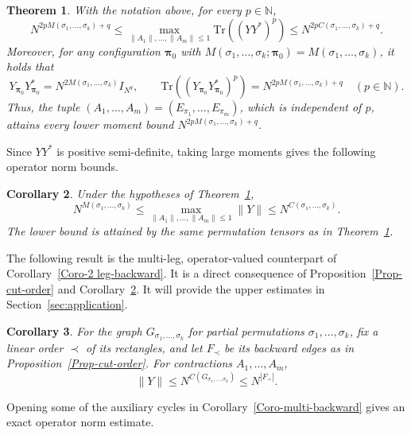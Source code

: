 \documentclass[12pt]{article}
\numberwithin{equation}{section}
\theoremstyle{plain}
\newtheorem{theorem}{Theorem}[section]
\newtheorem{corollary}[theorem]{Corollary}
\def\bN{\mathbb N}
\def\Tr{\mathrm {Tr}}
\begin{document}
\begin{theorem}\label{Thm-main-matrix}
With the notation above, for every $p\in\bN$,
\begin{equation}
N^{2pM(\sigma_1,\ldots,\sigma_k)+q}\le
\max_{\|A_1\|,\ldots,\|A_m\|\le1}\Tr((YY^*)^p)
\le N^{2pC(\sigma_1,\ldots,\sigma_k)+q}.
\end{equation}
Moreover, for any configuration $\boldsymbol\pi_0$ with $M(\sigma_1,\ldots,\sigma_k;\boldsymbol\pi_0)=M(\sigma_1,\ldots,\sigma_k)$, it holds that
\[
Y_{\boldsymbol\pi_0}Y_{\boldsymbol\pi_0}^*=N^{2M(\sigma_1,\ldots,\sigma_k)}I_{N^q},\qquad
\Tr((Y_{\boldsymbol\pi_0}Y_{\boldsymbol\pi_0}^*)^p)=N^{2pM(\sigma_1,\ldots,\sigma_k)+q}
\quad(p\in\bN).
\]
Thus, the tuple $(A_1,\ldots,A_m) = (E_{\pi_1},\ldots,E_{\pi_m})$, which is independent of $p$, attains every lower moment bound $N^{2pM(\sigma_1,\ldots,\sigma_k)+q}$.
\end{theorem}

Since $YY^*$ is positive semi-definite, taking large moments gives the following operator norm bounds.

\begin{corollary}\label{Coro-operator norm}
Under the hypotheses of Theorem~\ref{Thm-main-matrix},
\[
N^{M(\sigma_1,\ldots,\sigma_k)} \le \max_{\|A_1\|,\ldots,\|A_m\|\le1} \|Y\|\le N^{C(\sigma_1,\ldots,\sigma_k)}.
\]
The lower bound is attained by the same permutation tensors as in Theorem~\ref{Thm-main-matrix}.
\end{corollary}

The following result is the multi-leg, operator-valued counterpart of Corollary~\ref{Coro-2 leg-backward}. It is a direct consequence of Proposition~\ref{Prop-cut-order} and Corollary~\ref{Coro-operator norm}. It will provide the upper estimates in Section~\ref{sec:application}.

\begin{corollary} \label{Coro-partial-backward}
For the graph $G_{\sigma_1,\ldots,\sigma_k}$ for partial permutations $\sigma_1,\ldots,\sigma_k$, fix a linear order $\prec$ of its rectangles, and let $F_\prec$ be its backward edges as in Proposition~\ref{Prop-cut-order}. For contractions $A_1,\ldots,A_m$,
\[
\|Y\|\le N^{C(G_{\sigma_1,\ldots,\sigma_k})}\le N^{|F_\prec|}.
\]
\end{corollary}

Opening some of the auxiliary cycles in Corollary~\ref{Coro-multi-backward} gives an exact operator norm estimate.
\end{document}
